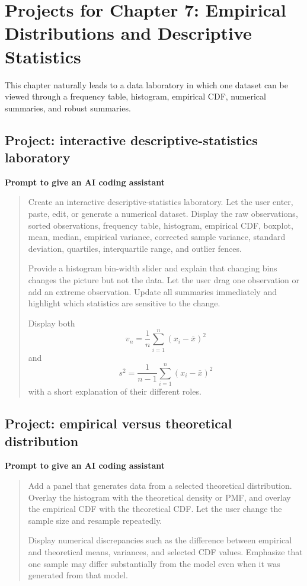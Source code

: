 \section{Projects for Chapter 7: Empirical Distributions and Descriptive Statistics}

This chapter naturally leads to a data laboratory in which one dataset can be viewed through a frequency table, histogram, empirical CDF, numerical summaries, and robust summaries.

\subsection*{Project: interactive descriptive-statistics laboratory}

\begin{examplebox}
\textbf{Prompt to give an AI coding assistant}

\begin{quote}\small
Create an interactive descriptive-statistics laboratory. Let the user enter, paste, edit, or generate a numerical dataset. Display the raw observations, sorted observations, frequency table, histogram, empirical CDF, boxplot, mean, median, empirical variance, corrected sample variance, standard deviation, quartiles, interquartile range, and outlier fences.

Provide a histogram bin-width slider and explain that changing bins changes the picture but not the data. Let the user drag one observation or add an extreme observation. Update all summaries immediately and highlight which statistics are sensitive to the change.

Display both
\[
v_n=\frac1n\sum_{i=1}^n(x_i-\bar x)^2
\]
and
\[
s^2=\frac1{n-1}\sum_{i=1}^n(x_i-\bar x)^2
\]
with a short explanation of their different roles.
\end{quote}
\end{examplebox}

\subsection*{Project: empirical versus theoretical distribution}

\begin{examplebox}
\textbf{Prompt to give an AI coding assistant}

\begin{quote}\small
Add a panel that generates data from a selected theoretical distribution. Overlay the histogram with the theoretical density or PMF, and overlay the empirical CDF with the theoretical CDF. Let the user change the sample size and resample repeatedly.

Display numerical discrepancies such as the difference between empirical and theoretical means, variances, and selected CDF values. Emphasize that one sample may differ substantially from the model even when it was generated from that model.
\end{quote}
\end{examplebox}

